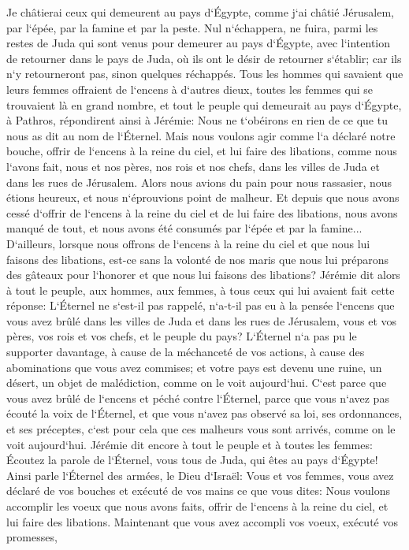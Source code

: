 \verse Je châtierai ceux qui demeurent au pays d`Égypte, comme j`ai châtié Jérusalem, par l`épée, par la famine et par la peste. 
\verse Nul n`échappera, ne fuira, parmi les restes de Juda qui sont venus pour demeurer au pays d`Égypte, avec l`intention de retourner dans le pays de Juda, où ils ont le désir de retourner s`établir; car ils n`y retourneront pas, sinon quelques réchappés. 
\verse Tous les hommes qui savaient que leurs femmes offraient de l`encens à d`autres dieux, toutes les femmes qui se trouvaient là en grand nombre, et tout le peuple qui demeurait au pays d`Égypte, à Pathros, répondirent ainsi à Jérémie: 
\verse Nous ne t`obéirons en rien de ce que tu nous as dit au nom de l`Éternel. 
\verse Mais nous voulons agir comme l`a déclaré notre bouche, offrir de l`encens à la reine du ciel, et lui faire des libations, comme nous l`avons fait, nous et nos pères, nos rois et nos chefs, dans les villes de Juda et dans les rues de Jérusalem. Alors nous avions du pain pour nous rassasier, nous étions heureux, et nous n`éprouvions point de malheur. 
\verse Et depuis que nous avons cessé d`offrir de l`encens à la reine du ciel et de lui faire des libations, nous avons manqué de tout, et nous avons été consumés par l`épée et par la famine... 
\verse D`ailleurs, lorsque nous offrons de l`encens à la reine du ciel et que nous lui faisons des libations, est-ce sans la volonté de nos maris que nous lui préparons des gâteaux pour l`honorer et que nous lui faisons des libations? 
\verse Jérémie dit alors à tout le peuple, aux hommes, aux femmes, à tous ceux qui lui avaient fait cette réponse: 
\verse L`Éternel ne s`est-il pas rappelé, n`a-t-il pas eu à la pensée l`encens que vous avez brûlé dans les villes de Juda et dans les rues de Jérusalem, vous et vos pères, vos rois et vos chefs, et le peuple du pays? 
\verse L`Éternel n`a pas pu le supporter davantage, à cause de la méchanceté de vos actions, à cause des abominations que vous avez commises; et votre pays est devenu une ruine, un désert, un objet de malédiction, comme on le voit aujourd`hui. 
\verse C`est parce que vous avez brûlé de l`encens et péché contre l`Éternel, parce que vous n`avez pas écouté la voix de l`Éternel, et que vous n`avez pas observé sa loi, ses ordonnances, et ses préceptes, c`est pour cela que ces malheurs vous sont arrivés, comme on le voit aujourd`hui. 
\verse Jérémie dit encore à tout le peuple et à toutes les femmes: Écoutez la parole de l`Éternel, vous tous de Juda, qui êtes au pays d`Égypte! 
\verse Ainsi parle l`Éternel des armées, le Dieu d`Israël: Vous et vos femmes, vous avez déclaré de vos bouches et exécuté de vos mains ce que vous dites: Nous voulons accomplir les voeux que nous avons faits, offrir de l`encens à la reine du ciel, et lui faire des libations. Maintenant que vous avez accompli vos voeux, exécuté vos promesses, 

